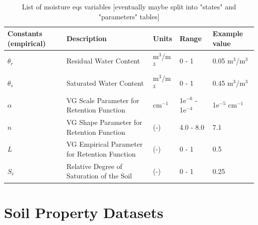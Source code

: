 \documentclass{report}
\begin{document}
\begin{table}[]
{\begin{tabular}{lllll}
\hline
Constants (empirical) & Description   & Units     & Range & Example value \\ \hline
$\theta_{r}$       & Residual Water Content   & m$^3$/m$^3$ & 0 - 1       & 0.05 m$^3$/m$^3$ \\
$\theta_{s}$       & Saturated Water Content   & m$^3$/m$^3$ & 0 - 1       & 0.45 m$^3$/m$^3$ \\
$\alpha$   & VG Scale Parameter for Retention Function & cm$^{-1}$ & 1e$^{-6}$ - 1e$^{-4}$  & 1e$^{-5}$ cm$^{-1}$ \\
$n$   & VG Shape Parameter for Retention Function & (-) & 4.0 - 8.0  & 7.1 \\
$L$   & VG Empirical Parameter for Retention Function & (-) & 0 - 1  & 0.5 \\
$S_{e}$   & Relative Degree of Saturation of the Soil & (-) & 0 - 1  & 0.25 \\
\hline
\end{tabular}%
}
\caption{List of moisture eqs variables [eventually maybe split into "states" and "parameters" tables]}
\end{table}

\section{Soil Property Datasets}\label{s:soil_data}
\end{document}
